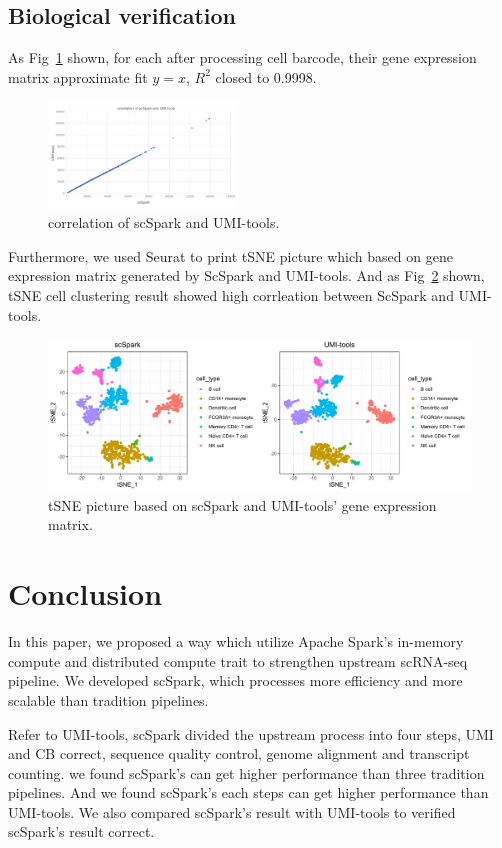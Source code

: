 \documentclass[conference]{IEEEtran}
\begin{document}
\subsection{Biological verification} 
As Fig~\ref{fig9} shown, for each after processing cell barcode, their gene expression matrix approximate fit $y=x$, $R^{2}$ closed to 0.9998. 
\begin{figure}
  \includegraphics[width=0.45\textwidth]{fig9.pdf}
  \caption{correlation of scSpark and UMI-tools.} \label{fig9}
\end{figure}
Furthermore, we used Seurat to print tSNE picture which based on gene expression matrix generated by ScSpark and UMI-tools. 
And as Fig~\ref{fig10} shown, tSNE cell clustering result showed high corrleation between ScSpark and UMI-tools. 
\begin{figure}
  \includegraphics[width=\textwidth]{fig10.pdf}
  \caption{tSNE picture based on scSpark and UMI-tools' gene expression matrix.} \label{fig10}
\end{figure}

\section{Conclusion}
In this paper, we proposed a way which utilize Apache Spark's in-memory compute and distributed compute trait to strengthen upstream scRNA-seq pipeline.
We developed scSpark, which processes more efficiency and more scalable than tradition pipelines.

Refer to UMI-tools, scSpark divided the upstream process into four steps, UMI and CB correct, sequence quality control, genome alignment and transcript counting.
we found scSpark's can get higher performance than three tradition pipelines.
And we found scSpark's each steps can get higher performance than UMI-tools.
We also compared scSpark's result with UMI-tools to verified scSpark's result correct.



\end{document}

